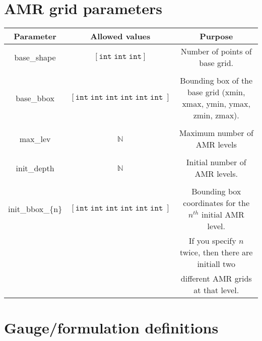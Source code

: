 \documentclass{article}
\begin{document}
\newpage

\newpage
\section*{AMR grid parameters}
\begin{table}[h]
   \centering 
   \begin{tabular}{ccc}
      Parameter  & Allowed values & Purpose \\
      \midrule\midrule
      base\_shape 
      &
      $\left[
         \mathtt{int} \;
         \mathtt{int} \;
         \mathtt{int}
      \right]$
      &
      Number of points of base grid.
      \\ \\ 
      base\_bbox 
      &
      $\left[
         \mathtt{int} \; \mathtt{int} \;
         \mathtt{int} \; \mathtt{int} \;
         \mathtt{int} \; \mathtt{int} \;
      \right]$
      &
      Bounding box of the base grid (xmin, xmax, ymin, ymax, zmin, zmax).
      \\ \\
      max\_lev 
      &
      $\mathbb{N}$
      &
      Maximum number of AMR levels
      \\ \\
      init\_depth
      &
      $\mathbb{N}$
      &
      Initial number of AMR levels.
      \\ \\
      init\_bbox\_\{n\}
      &
      $\left[
         \mathtt{int} \; \mathtt{int} \;
         \mathtt{int} \; \mathtt{int} \;
         \mathtt{int} \; \mathtt{int} \;
      \right]$
      &
      Bounding box coordinates for the $n^{th}$
      initial AMR level.
      \\
      & & 
      If you specify $n$ twice, then there are initiall two
      \\
      & & 
      different AMR grids at that level.
   \end{tabular}
\end{table}

\newpage
\section*{Gauge/formulation definitions}
\end{document}
